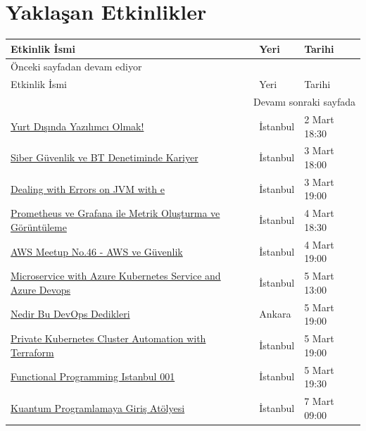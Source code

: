 \documentclass[11pt]{article}
\begin{document}
\section{Yaklaşan Etkinlikler}
\label{sec:org9bebd89}
\begin{longtable}{|p{8cm}|l|l|}
\hline
Etkinlik İsmi & Yeri & Tarihi\\
\hline
\endfirsthead
\multicolumn{3}{l}{Önceki sayfadan devam ediyor} \\
\hline

Etkinlik İsmi & Yeri & Tarihi \\

\hline
\endhead
\hline\multicolumn{3}{r}{Devamı sonraki sayfada} \\
\endfoot
\endlastfoot
\hline
\href{https://www.eventbrite.com/e/yurt-dsnda-yazlmc-olmak-tickets-97277791493}{Yurt Dışında Yazılımcı Olmak!} & İstanbul & 2 Mart 18:30\\
\href{https://www.eventbrite.com/e/siber-guvenlik-ve-bt-denetiminde-kariyer-registration-96218045765}{Siber Güvenlik ve BT Denetiminde Kariyer} & İstanbul & 3 Mart 18:00\\
\href{https://www.meetup.com/DevTest-Community/events/269032606/}{Dealing with Errors on JVM with e} & İstanbul & 3 Mart 19:00\\
\href{https://kommunity.com/devops-turkiye/events/prometheus-ve-grafana-ile-metrik-olusturma-ve-goruntuleme}{Prometheus ve Grafana ile Metrik Oluşturma ve Görüntüleme} & İstanbul & 4 Mart 18:30\\
\href{https://www.meetup.com/AWS-User-Group-Turkey/events/268979622/}{AWS Meetup No.46 - AWS ve Güvenlik} & İstanbul & 4 Mart 19:00\\
\href{https://www.meetup.com/Microsoft-Giri\%25C5\%259Fimcilik-Bulu\%25C5\%259Fmalar\%25C4\%25B1/events/268504717/}{Microservice with Azure Kubernetes Service and Azure Devops} & İstanbul & 5 Mart 13:00\\
\href{https://www.eventbrite.com/e/nedir-bu-devops-dedikleri-tickets-95894584283}{Nedir Bu DevOps Dedikleri} & Ankara & 5 Mart 19:00\\
\href{https://www.meetup.com/Istanbul-Hackers/events/268983054/}{Private Kubernetes Cluster Automation with Terraform} & İstanbul & 5 Mart 19:00\\
\href{https://kommunity.com/fp-istanbul/events/functional-programming-istanbul-001}{Functional Programming Istanbul 001} & İstanbul & 5 Mart 19:30\\
\href{https://www.meetup.com/QWomen-\%25C4\%25B0stanbul/events/268233749/}{Kuantum Programlamaya Giriş Atölyesi} & İstanbul & 7 Mart 09:00\\

\end{longtable}
\end{document}
